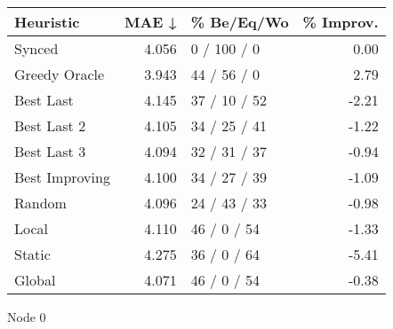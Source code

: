 \begin{tabular}{lrlr}
\toprule
\textbf{Heuristic} & \textbf{MAE ↓} & \textbf{\% Be/Eq/Wo} & \textbf{\% Improv.} \\
\midrule
            Synced &          4.056 &          0 / 100 / 0 &                0.00 \\
     Greedy Oracle &          3.943 &          44 / 56 / 0 &                2.79 \\
         Best Last &          4.145 &         37 / 10 / 52 &               -2.21 \\
       Best Last 2 &          4.105 &         34 / 25 / 41 &               -1.22 \\
       Best Last 3 &          4.094 &         32 / 31 / 37 &               -0.94 \\
    Best Improving &          4.100 &         34 / 27 / 39 &               -1.09 \\
            Random &          4.096 &         24 / 43 / 33 &               -0.98 \\
             Local &          4.110 &          46 / 0 / 54 &               -1.33 \\
            Static &          4.275 &          36 / 0 / 64 &               -5.41 \\
            Global &          4.071 &          46 / 0 / 54 &               -0.38 \\
\bottomrule
\end{tabular}
\caption{Node 0}
\label{tab:hr_non_lr05_le1_bs2_0}
